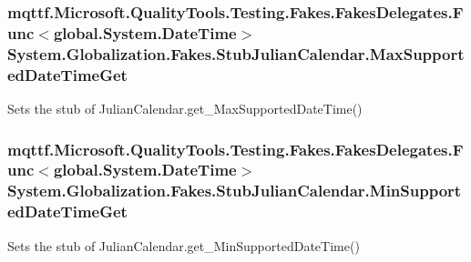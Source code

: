 \hypertarget{class_system_1_1_globalization_1_1_fakes_1_1_stub_julian_calendar_a2d5a8b651cc3ff7db26f630b58bb35b9}{
\subsubsection[{Max\-Supported\-Date\-Time\-Get}]{\setlength{\rightskip}{0pt plus 5cm}mqttf.\-Microsoft.\-Quality\-Tools.\-Testing.\-Fakes.\-Fakes\-Delegates.\-Func$<$global.\-System.\-Date\-Time$>$ System.\-Globalization.\-Fakes.\-Stub\-Julian\-Calendar.\-Max\-Supported\-Date\-Time\-Get}}\label{class_system_1_1_globalization_1_1_fakes_1_1_stub_julian_calendar_a2d5a8b651cc3ff7db26f630b58bb35b9}


Sets the stub of Julian\-Calendar.\-get\-\_\-\-Max\-Supported\-Date\-Time()

\hypertarget{class_system_1_1_globalization_1_1_fakes_1_1_stub_julian_calendar_a4f45eeb7770ca1979b58035f6eed5afa}{
\subsubsection[{Min\-Supported\-Date\-Time\-Get}]{\setlength{\rightskip}{0pt plus 5cm}mqttf.\-Microsoft.\-Quality\-Tools.\-Testing.\-Fakes.\-Fakes\-Delegates.\-Func$<$global.\-System.\-Date\-Time$>$ System.\-Globalization.\-Fakes.\-Stub\-Julian\-Calendar.\-Min\-Supported\-Date\-Time\-Get}}\label{class_system_1_1_globalization_1_1_fakes_1_1_stub_julian_calendar_a4f45eeb7770ca1979b58035f6eed5afa}


Sets the stub of Julian\-Calendar.\-get\-\_\-\-Min\-Supported\-Date\-Time()

